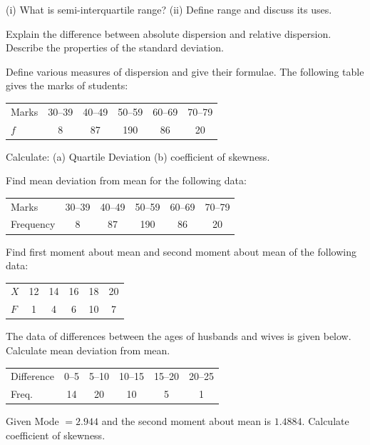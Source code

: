 \documentclass[11pt,a4paper]{article}
\begin{document}
\begin{longlist}
\item [80.] (i) What is semi-interquartile range? (ii) Define range and discuss its uses.

\item Explain the difference between absolute dispersion and relative dispersion. Describe the properties of the standard deviation.

\item [82.] Define various measures of dispersion and give their formulae. The following table gives the marks of students:
\begin{center}
\begin{tabular}{l|ccccc}
Marks & 30--39 & 40--49 & 50--59 & 60--69 & 70--79 \\
$f$ & 8 & 87 & 190 & 86 & 20
\end{tabular}
\end{center}
Calculate: (a) Quartile Deviation (b) coefficient of skewness.

\item Find mean deviation from mean for the following data:
\begin{center}
\begin{tabular}{l|ccccc}
Marks & 30--39 & 40--49 & 50--59 & 60--69 & 70--79 \\
Frequency & 8 & 87 & 190 & 86 & 20
\end{tabular}
\end{center}

\item Find first moment about mean and second moment about mean of the following data:
\begin{center}
\begin{tabular}{l|ccccc}
$X$ & 12 & 14 & 16 & 18 & 20 \\
$F$ & 1 & 4 & 6 & 10 & 7
\end{tabular}
\end{center}

\item The data of differences between the ages of husbands and wives is given below. Calculate mean deviation from mean.
\begin{center}
\begin{tabular}{l|ccccc}
Difference & 0--5 & 5--10 & 10--15 & 15--20 & 20--25 \\
Freq. & 14 & 20 & 10 & 5 & 1
\end{tabular}
\end{center}

\item Given Mode $=2.944$ and the second moment about mean is $1.4884$. Calculate coefficient of skewness.


\end{longlist}
\end{document}
